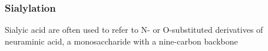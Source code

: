 \subsubsection {Sialylation}
Sialyic acid are often used to refer to N- or O-substituted derivatives of neuraminic acid, a monosaccharide with a nine-carbon backbone